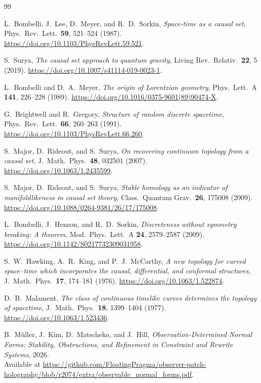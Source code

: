 \documentclass[11pt]{article}
\theoremstyle{remark}
\theoremstyle{plain}
\begin{document}
\begin{thebibliography}{99}

L.~Bombelli, J.~Lee, D.~Meyer, and R.~D.~Sorkin,
\emph{Space-time as a causal set},
Phys.\ Rev.\ Lett.\ \textbf{59}, 521--524 (1987).
\url{https://doi.org/10.1103/PhysRevLett.59.521}.

S.~Surya,
\emph{The causal set approach to quantum gravity},
Living Rev.\ Relativ.\ \textbf{22}, 5 (2019).
\url{https://doi.org/10.1007/s41114-019-0023-1}.

L.~Bombelli and D.~A.~Meyer,
\emph{The origin of Lorentzian geometry},
Phys.\ Lett.\ A \textbf{141}, 226--228 (1989).
\url{https://doi.org/10.1016/0375-9601(89)90474-X}.

G.~Brightwell and R.~Gregory,
\emph{Structure of random discrete spacetime},
Phys.\ Rev.\ Lett.\ \textbf{66}, 260--263 (1991).
\url{https://doi.org/10.1103/PhysRevLett.66.260}.

S.~Major, D.~Rideout, and S.~Surya,
\emph{On recovering continuum topology from a causal set},
J.\ Math.\ Phys.\ \textbf{48}, 032501 (2007).
\url{https://doi.org/10.1063/1.2435599}.

S.~Major, D.~Rideout, and S.~Surya,
\emph{Stable homology as an indicator of manifoldlikeness in causal set theory},
Class.\ Quantum Grav.\ \textbf{26}, 175008 (2009).
\url{https://doi.org/10.1088/0264-9381/26/17/175008}.

L.~Bombelli, J.~Henson, and R.~D.~Sorkin,
\emph{Discreteness without symmetry breaking: A theorem},
Mod.\ Phys.\ Lett.\ A \textbf{24}, 2579--2587 (2009).
\url{https://doi.org/10.1142/S0217732309031958}.

S.~W.~Hawking, A.~R.~King, and P.~J.~McCarthy,
\emph{A new topology for curved space--time which incorporates the causal,
differential, and conformal structures},
J.\ Math.\ Phys.\ \textbf{17}, 174--181 (1976).
\url{https://doi.org/10.1063/1.522874}.

D.~B.~Malament,
\emph{The class of continuous timelike curves determines the topology of spacetime},
J.\ Math.\ Phys.\ \textbf{18}, 1399--1404 (1977).
\url{https://doi.org/10.1063/1.523436}.

B.\ M\"uller, J.\ Kim, D.\ Matscheko, and J.\ Hill,
\emph{Observation-Determined Normal Forms: Stability, Obstructions, and Refinement in Constraint
and Rewrite Systems},
2026.\\
Available at \url{https://github.com/FloatingPragma/observer-patch-holography/blob/r2074/extra/observable_normal_forms.pdf}.


\end{thebibliography}
\end{document}
